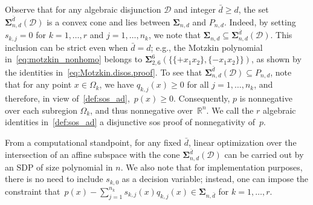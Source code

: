 \documentclass[12pt]{article}
\newcommand{\reals}{\mathbb{R}}
\newcommand{\NN}{P}
\newcommand{\SOS}{\mathbf{\Sigma}}
\newcommand{\HNN}{\widehat{P}}
\newcommand{\DiSOS}{\mathbf{\Sigma}}
\newcommand{\mcD}{\mathcal{D}}
\theoremstyle{remark}
\begin{document}
Observe that for any algebraic disjunction $\mcD$ and integer $\bar{d}\ge d$, the set $\DiSOS^{\bar{d}}_{n,d}(\mcD)$ is a convex cone and lies between $\SOS_{n,d}$ and $\NN_{n,d}$. 
Indeed, by setting $s_{k,j}=0$ for $k=1,\ldots,r$ and $j=1,\ldots,n_k$, we note that $\SOS_{n,d}\subseteq\DiSOS^{\bar{d}}_{n,d}(\mcD)$. This inclusion can be strict even when $\bar{d}=d$; e.g., the Motzkin polynomial in~\eqref{eq:motzkin_nonhomo} belongs to $\DiSOS_{2,6}^{6}(\{ \{+x_1x_2\},\{-x_1x_2\}\})$, as shown by the identities in~\eqref{eq:Motzkin.disos.proof}. 
To see that $\DiSOS^{\bar{d}}_{n,d}(\mcD)\subseteq \NN_{n,d}$, note that for any point $x\in\Omega_k$, we have $q_{k,j}(x)\ge 0$ for all $j=1,\ldots,n_k$, and therefore, in view of~\eqref{def:sos_ad},~$p(x)\ge 0$. 
Consequently, $p$ is nonnegative over each subregion $\Omega_k$, and thus nonnegative over~$\reals^n$. We call the $r$ algebraic identities in~\eqref{def:sos_ad} a disjunctive sos proof of nonnegativity of~$p$. %

From a computational standpoint, for any fixed $\bar{d}$, linear optimization over the intersection of an affine subspace with the cone $\DiSOS_{n,d}^{\bar{d}}(\mcD)$ can be carried out by an SDP of size polynomial in $n$. We also note that for implementation purposes, there is no need to include $s_{k,0}$ as a decision variable; instead, one can impose the constraint that~${p(x)-\sum_{j=1}^{n_k} s_{k,j}(x)q_{k,j}(x)\in\SOS_{n,\bar{d}}}$ for $k=1,\ldots,r$. 

\end{document}
